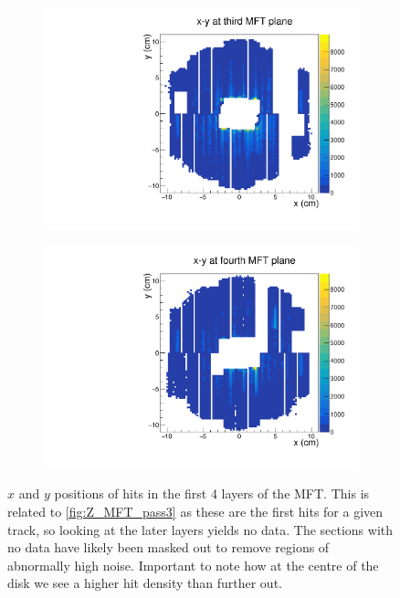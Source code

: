 \begin{figure}[H]
\begin{subfigure}[t]{.45\linewidth}
        \includegraphics[width=\linewidth]{Plots/pass3_MFT/x_y_3_pass3.pdf}
        \caption{}
        \label{fig:x_y_3_pass3}
    \end{subfigure}
    \hfill
    \begin{subfigure}[t]{.45\linewidth}
        \centering
        \includegraphics[width=\linewidth]{Plots/pass3_MFT/x_y_4_pass3.pdf}
        \caption{}
        \label{fig:x_y_4_pass3}
    \end{subfigure}
\caption[$x$-$y$ histograms of tracks at different planes of the MFT]{$x$ and $y$ positions of hits in the first 4 layers of the MFT. This is related to \cref{fig:Z_MFT_pass3} as these are the first hits for a given track, so looking at the later layers yields no data. The sections with no data have likely been masked out to remove regions of abnormally high noise. Important to note how at the centre of the disk we see a higher hit density than further out.}
\label{fig:MFT_x_y_pass3}
\end{figure}

